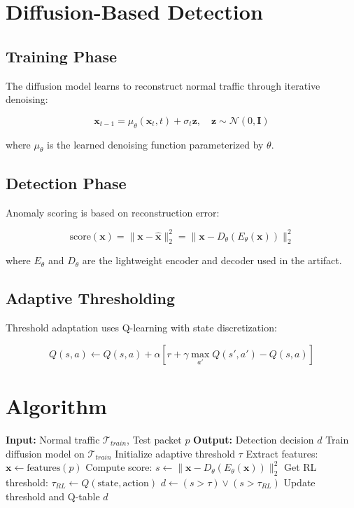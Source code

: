 \documentclass[sigconf]{acmart}
\begin{document}
\section{Diffusion-Based Detection}

\subsection{Training Phase}

The diffusion model learns to reconstruct normal traffic through iterative denoising:

\begin{equation}
\mathbf{x}_{t-1} = \mu_\theta(\mathbf{x}_t, t) + \sigma_t \mathbf{z}, \quad \mathbf{z} \sim \mathcal{N}(0, \mathbf{I})
\end{equation}

where $\mu_\theta$ is the learned denoising function parameterized by $\theta$.

\subsection{Detection Phase}

Anomaly scoring is based on reconstruction error:

\begin{equation}
\text{score}(\mathbf{x}) = \|\mathbf{x} - \hat{\mathbf{x}}\|_2^2 = \|\mathbf{x} - D_\theta(E_\theta(\mathbf{x}))\|_2^2
\end{equation}

where $E_\theta$ and $D_\theta$ are the lightweight encoder and decoder used in the artifact.

\subsection{Adaptive Thresholding}

Threshold adaptation uses Q-learning with state discretization:

\begin{equation}
Q(s, a) \leftarrow Q(s, a) + \alpha [r + \gamma \max_{a'} Q(s', a') - Q(s, a)]
\end{equation}

\section{Algorithm}

\begin{algorithm}
\caption{Diffusion Covert Detection}
\begin{algorithmic}[1]
\State \textbf{Input:} Normal traffic $\mathcal{T}_{train}$, Test packet $p$
\State \textbf{Output:} Detection decision $d$
\State Train diffusion model on $\mathcal{T}_{train}$
\State Initialize adaptive threshold $\tau$
\State Extract features: $\mathbf{x} \leftarrow \text{features}(p)$
\State Compute score: $s \leftarrow \|\mathbf{x} - D_\theta(E_\theta(\mathbf{x}))\|_2^2$
\State Get RL threshold: $\tau_{RL} \leftarrow Q(\text{state}, \text{action})$
\State $d \leftarrow (s > \tau) \lor (s > \tau_{RL})$
\State Update threshold and Q-table
\State \Return $d$
\end{algorithmic}
\end{algorithm}
\end{document}
